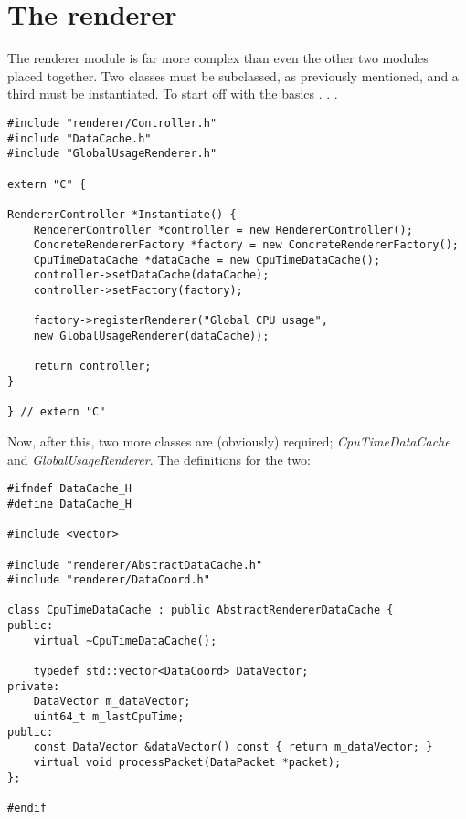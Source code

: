 \section{The renderer}
The renderer module is far more complex than even the other two modules placed together. Two classes must be
subclassed, as previously mentioned, and a third must be instantiated. To start off with the basics . . .

\begin{lstlisting}
#include "renderer/Controller.h"
#include "DataCache.h"
#include "GlobalUsageRenderer.h"

extern "C" {

RendererController *Instantiate() {
    RendererController *controller = new RendererController();
    ConcreteRendererFactory *factory = new ConcreteRendererFactory();
    CpuTimeDataCache *dataCache = new CpuTimeDataCache();
    controller->setDataCache(dataCache);
    controller->setFactory(factory);

    factory->registerRenderer("Global CPU usage",
	new GlobalUsageRenderer(dataCache));

    return controller;
}

} // extern "C"
\end{lstlisting}

Now, after this, two more classes are (obviously) required; \emph{CpuTimeDataCache} and \emph{GlobalUsageRenderer}. The
definitions for the two:

\begin{lstlisting}
#ifndef DataCache_H
#define DataCache_H

#include <vector>

#include "renderer/AbstractDataCache.h"
#include "renderer/DataCoord.h"

class CpuTimeDataCache : public AbstractRendererDataCache {
public:
    virtual ~CpuTimeDataCache();
    
    typedef std::vector<DataCoord> DataVector;
private:
    DataVector m_dataVector;
    uint64_t m_lastCpuTime;
public:
    const DataVector &dataVector() const { return m_dataVector; }
    virtual void processPacket(DataPacket *packet);
};

#endif

\end{lstlisting}

